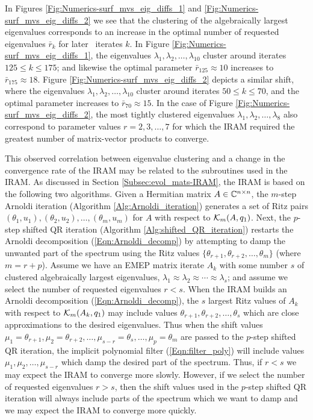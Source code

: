 In Figures \ref{Fig:Numerics-surf_mvs_eig_diffs_1} and \ref{Fig:Numerics-surf_mvs_eig_diffs_2} we see that the clustering of the algebraically largest eigenvalues corresponds to an increase in the optimal number of requested eigenvalues $\bar{r}_k$ for later \emep \ iterates $k$.
In Figure \ref{Fig:Numerics-surf_mvs_eig_diffs_1}, the eigenvalues $\lambda_1, \lambda_2, \ldots, \lambda_{10}$ cluster around iterates $125 \leq k \leq 175$; and likewise the optimal parameter $\bar{r}_{125} \approx 10$ increases to $\bar{r}_{175} \approx 18$.
Figure \ref{Fig:Numerics-surf_mvs_eig_diffs_2} depicts a similar shift, where the eigenvalues $\lambda_1, \lambda_2, \ldots, \lambda_{10}$ cluster around iterates $50 \leq k \leq 70$, and the optimal parameter increases to $\bar{r}_{70} \approx 15$.
In the case of Figure \ref{Fig:Numerics-surf_mvs_eig_diffs_2}, the most tightly clustered eigenvalues $\lambda_1, \lambda_2, \ldots, \lambda_{8}$ also correspond to parameter values $r = 2, 3, \ldots, 7$ for which the IRAM required the greatest number of matrix-vector products to converge.



This observed correlation between eigenvalue clustering and a change in the convergence rate of the IRAM may be related to the subroutines used in the IRAM.
As discussed in Section \ref{Subsec:evol_mats-IRAM}, the IRAM is based on the following two algorithms.
Given a Hermitian matrix $A \in {\mathbb C}^{n \times n}$, the $m$-step Arnoldi iteration (Algorithm \ref{Alg:Arnoldi_iteration}) generates a set of Ritz pairs $(\theta_1, u_1), (\theta_2, u_2), \ldots, (\theta_m, u_m)$ for $A$ with respect to ${\mathcal K}_m(A, q_1)$.
Next, the $p$-step shifted QR iteration (Algorithm \ref{Alg:shifted_QR_iteration}) restarts the Arnoldi decomposition (\ref{Eqn:Arnoldi_decomp}) by attempting to damp the unwanted part of the spectrum using the Ritz values $\{ \theta_{r+1}, \theta_{r+2}, \ldots, \theta_m \}$ (where $m = r + p$).
Assume we have an EMEP matrix iterate $A_k$ with some number $s$ of clustered algebraically largest eigenvalues, $\lambda_1 \approx \lambda_2 \approx \cdots \approx \lambda_s$; 
and assume we select the number of requested eigenvalues $r < s$.
When the IRAM builds an Arnoldi decomposition (\ref{Eqn:Arnoldi_decomp}), the $s$ largest Ritz values of $A_k$ with respect to ${\mathcal K}_m(A_k, q_1)$ may include values $\theta_{r+1}, \theta_{r+2}, \ldots, \theta_s$ which are close approximations to the desired eigenvalues.
Thus when the shift values $\mu_1 = \theta_{r+1}, \mu_2 = \theta_{r+2}, \ldots, \mu_{s-r} = \theta_{s}, \ldots, \mu_p = \theta_m$ are passed to the $p$-step shifted QR iteration, the implicit polynomial filter (\ref{Eqn:filter_poly}) will include values $\mu_1, \mu_2, \ldots, \mu_{s-r}$ which damp the desired part of the spectrum.
Thus, if $r < s$ we may expect the IRAM to converge more slowly.
However, if we select the number of requested eigenvalues $r > s$, then the shift values used in the $p$-step shifted QR iteration will always include parts of the spectrum which we want to damp and we may expect the IRAM to converge more quickly. 


